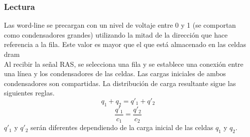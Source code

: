 \subsubsection{Lectura}
Las word-line se precargan con un nivel de voltaje entre 0  y 1 (se comportan como condensadores grandes) utilizando la mitad de la dirección que hace referencia a la fila. Este valor es mayor que el que está almacenado en las celdas \gls{dram}\\
Al recibir la señal RAS, se selecciona una fila y se establece una conexión entre una línea y los condensadores de las celdas. Las cargas iniciales de ambos condensadores son compartidas. La distribución de carga resultante sigue las siguientes reglas.
\[
	q_{1} + q_{2} = q'_{1} + q'_{2}
\]
\[
	\frac{q'_{1}}{c_{1}} = \frac{q'_{2}}{c_{2}}
\]
\noindent$q'_{1}$ y $q'_{2}$ serán diferentes dependiendo de la carga inicial de las celdas $q_{1}$ y $q_{2}$.
